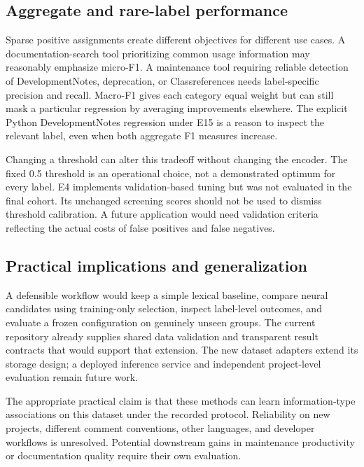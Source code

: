 \subsection{Aggregate and rare-label performance}
Sparse positive assignments create different objectives for different use cases. A documentation-search tool prioritizing common usage information may reasonably emphasize micro-F1. A maintenance tool requiring reliable detection of DevelopmentNotes, deprecation, or Classreferences needs label-specific precision and recall. Macro-F1 gives each category equal weight but can still mask a particular regression by averaging improvements elsewhere. The explicit Python DevelopmentNotes regression under E15 is a reason to inspect the relevant label, even when both aggregate F1 measures increase.

Changing a threshold can alter this tradeoff without changing the encoder. The fixed 0.5 threshold is an operational choice, not a demonstrated optimum for every label. E4 implements validation-based tuning but was not evaluated in the final cohort. Its unchanged screening scores should not be used to dismiss threshold calibration. A future application would need validation criteria reflecting the actual costs of false positives and false negatives.

\subsection{Practical implications and generalization}
A defensible workflow would keep a simple lexical baseline, compare neural candidates using training-only selection, inspect label-level outcomes, and evaluate a frozen configuration on genuinely unseen groups. The current repository already supplies shared data validation and transparent result contracts that would support that extension. The new dataset adapters extend its storage design; a deployed inference service and independent project-level evaluation remain future work.

The appropriate practical claim is that these methods can learn information-type associations on this dataset under the recorded protocol. Reliability on new projects, different comment conventions, other languages, and developer workflows is unresolved. Potential downstream gains in maintenance productivity or documentation quality require their own evaluation.
